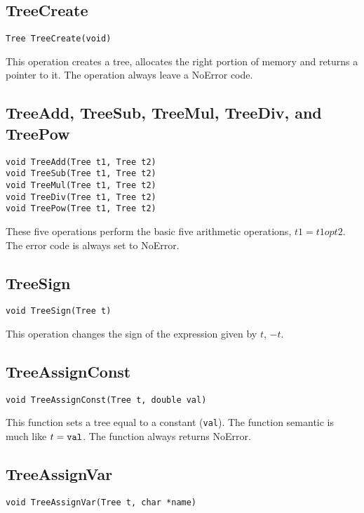 \subsection{TreeCreate}
\label{treecreate}
\begin{verbatim}
Tree TreeCreate(void)
\end{verbatim}

This operation creates a tree, \ie allocates the right portion of 
memory and returns a pointer to it. The operation always leave a 
NoError code.

\subsection{TreeAdd, TreeSub, TreeMul, TreeDiv, and TreePow}
\begin{verbatim}
void TreeAdd(Tree t1, Tree t2)
void TreeSub(Tree t1, Tree t2)
void TreeMul(Tree t1, Tree t2)
void TreeDiv(Tree t1, Tree t2)
void TreePow(Tree t1, Tree t2)
\end{verbatim}

These five operations perform the basic five arithmetic operations, \ie 
$t1 = t1 op t2$. 
The error code is always set to NoError.

\subsection{TreeSign}
\begin{verbatim}
void TreeSign(Tree t)
\end{verbatim}

This operation changes the sign of the expression given by $t$, \ie $-t$.

\subsection{TreeAssignConst}
\label{treeassign}
\begin{verbatim}
void TreeAssignConst(Tree t, double val)
\end{verbatim}

This function sets a tree equal to a constant ({\tt val}). The function
semantic is much like $t = \mbox{{\tt val}}$. The function always
returns NoError. 

\subsection{TreeAssignVar}
\begin{verbatim}
void TreeAssignVar(Tree t, char *name)
\end{verbatim}

